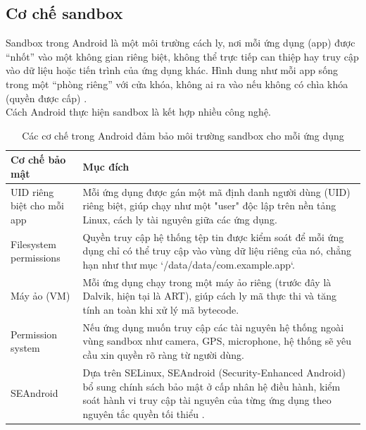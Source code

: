 \subsection{Cơ chế sandbox}
\renewcommand{\labelitemi}{--}    
        Sandbox trong Android là một môi trường cách ly, nơi mỗi ứng dụng (app) được “nhốt” vào một không gian riêng biệt, không thể trực tiếp can thiệp hay truy cập vào dữ liệu hoặc tiến trình của ứng dụng khác. Hình dung như mỗi app sống trong một “phòng riêng” với cửa khóa, không ai ra vào nếu không có chìa khóa (quyền được cấp) \cite{app-sandbox}.\\
        \setlength{\leftmargini}{1.5cm}
        Cách Android thực hiện sandbox là kết hợp nhiều công nghệ.
        \begin{table}[H]
            \centering
            \renewcommand{\arraystretch}{1.5}
            \begin{tabular}{|p{4.5cm}|p{11cm}|}
                \hline
                \textbf{Cơ chế bảo mật} & \textbf{Mục đích} \\
                \hline
                UID riêng biệt cho mỗi app & Mỗi ứng dụng được gán một mã định danh người dùng (UID) riêng biệt, giúp chạy như một "user" độc lập trên nền tảng Linux, cách ly tài nguyên giữa các ứng dụng. \\
                \hline
                Filesystem permissions & Quyền truy cập hệ thống tệp tin được kiểm soát để mỗi ứng dụng chỉ có thể truy cập vào vùng dữ liệu riêng của nó, chẳng hạn như thư mục `/data/data/com.example.app`. \\
                \hline
                Máy ảo (VM) & Mỗi ứng dụng chạy trong một máy ảo riêng (trước đây là Dalvik, hiện tại là ART), giúp cách ly mã thực thi và tăng tính an toàn khi xử lý mã bytecode. \\
                \hline
                Permission system & Nếu ứng dụng muốn truy cập các tài nguyên hệ thống ngoài vùng sandbox như camera, GPS, microphone, hệ thống sẽ yêu cầu xin quyền rõ ràng từ người dùng. \\
                \hline
                SEAndroid & Dựa trên SELinux, SEAndroid (Security-Enhanced Android) bổ sung chính sách bảo mật ở cấp nhân hệ điều hành, kiểm soát hành vi truy cập tài nguyên của từng ứng dụng theo nguyên tắc quyền tối thiểu \cite{Android-Security-Overview}. \\
                \hline
            \end{tabular}
            \caption{Các cơ chế trong Android đảm bảo môi trường sandbox cho mỗi ứng dụng}
            \label{table:android-sandbox-mechanisms}
            \end{table}
            
